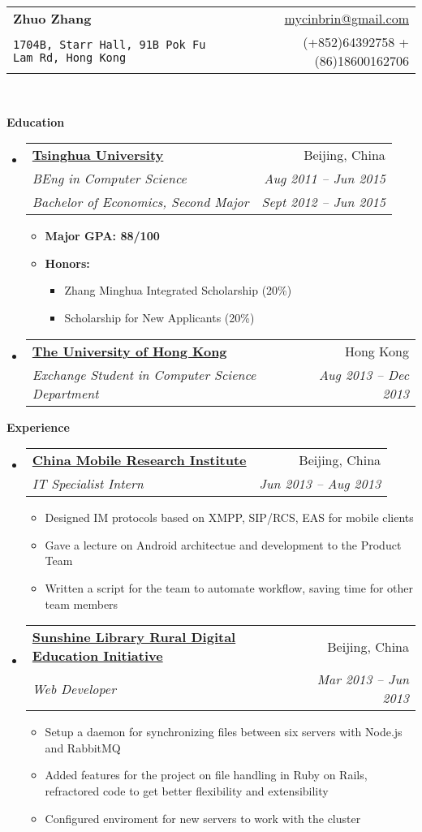 \documentclass[letterpaper,11pt]{article}
\makeatletter
\newcommand{\resitem}[1]{\item #1 \vspace{-2pt}}
\newcommand{\resheading}[1]{{\large \colorbox{mygrey}{\begin{minipage}{\textwidth}{\textbf{#1 \vphantom{p\^{E}}}}\end{minipage}}}}
\newcommand{\ressubheading}[4]{
\begin{tabular*}{6.5in}{l@{\extracolsep{\fill}}r}
		\textbf{#1} & #2 \\
		\textit{#3} & \textit{#4} \\
\end{tabular*}\vspace{-6pt}}
\newcommand{\ressubheadingg}[6]{
\begin{tabular*}{6.5in}{l@{\extracolsep{\fill}}r}
		\textbf{#1} & #2 \\
		\textit{#3} & \textit{#4} \\
		\textit{#5} & \textit{#6} \\
\end{tabular*}\vspace{-6pt}}
\makeatother
\begin{document}
\newcommand{\mywebheader}{
\begin{tabular*}{7in}{l@{\extracolsep{\fill}}r}
	\textbf{{\LARGE Zhuo Zhang}} & \href{mailto:mycinbrin@gmail.com}{mycinbrin@gmail.com}\\
	{\footnotesize \texttt{1704B, Starr Hall, 91B Pok Fu Lam Rd, Hong Kong}} & {(+852)64392758 +(86)18600162706}
	\end{tabular*}
\\
\vspace{0.1in}}

\mywebheader

\resheading{Education}
	\begin{itemize}
			\item
				\ressubheadingg{\href{http://www.tsinghua.edu.cn}{Tsinghua University}}{Beijing, China}{{BEng in Computer Science}}{Aug 2011 -- Jun 2015}{Bachelor of Economics, Second Major}{Sept 2012 -- Jun 2015}
				{ \footnotesize
				\begin{itemize}
						\resitem{\textbf{Major GPA: 88/100}}
						\resitem{\textbf{Honors:}} 
						\begin{itemize}
								\resitem{Zhang Minghua Integrated Scholarship (20\%) }
								\resitem{Scholarship for New Applicants (20\%) }
						\end{itemize}
				\end{itemize}
				}
			\item
				\ressubheading{\href{http://www.hku.hku}{The University of Hong Kong}}{Hong Kong}{Exchange Student in Computer Science Department}{Aug 2013 -- Dec 2013}{}
	\end{itemize} %

\resheading{Experience}
	\begin{itemize}
		\item 
			\ressubheading{\href{http://labs.chinamobile.com/}{China Mobile Research Institute}}{Beijing, China}
				{IT Specialist Intern}{Jun 2013 -- Aug 2013}
				{ \footnotesize
				\begin{itemize}

						\resitem{Designed IM protocols based on XMPP, SIP/RCS, EAS for mobile clients}
						\resitem{Gave a lecture on Android architectue and development to the Product Team}
						\resitem{Written a script for the team to automate workflow, saving time for other team members}
				\end{itemize}
				}
		\item 
			\ressubheading{\href{http://www.sunshine-library.org}{Sunshine Library Rural Digital Education Initiative}}{Beijing, China}{Web Developer}{Mar 2013 -- Jun 2013}
				{ \footnotesize
				\begin{itemize}
						\resitem{Setup a daemon for synchronizing files between six servers with Node.js and RabbitMQ}
						\resitem{Added features for the project on file handling in Ruby on Rails, refractored code to get better flexibility and extensibility}
						\resitem{Configured enviroment for new servers to work with the cluster}
				\end{itemize}
				}
	\end{itemize}  %
\end{document}
